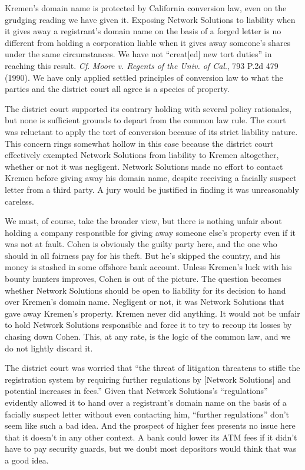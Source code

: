 Kremen's domain name is protected by California conversion law, even on the
grudging reading we have given it. Exposing Network Solutions to liability when
it gives away a registrant's domain name on the basis of a forged letter is no
different from holding a corporation liable when it gives away someone's shares
under the same circumstances. We have not ``creat[ed] new tort duties'' in
reaching this result. \textit{Cf}. \textit{Moore v. Regents of the Univ. of
Cal}., 793 P.2d 479 (1990). We have only applied settled principles of
conversion law to what the parties and the district court all agree is a
species of property.

The district court supported its contrary holding with several policy
rationales, but none is sufficient grounds to depart from the common law rule.
The court was reluctant to apply the tort of conversion because of its strict
liability nature. This concern rings somewhat hollow in this case because the
district court effectively exempted Network Solutions from liability to Kremen
altogether, whether or not it was negligent. Network Solutions made no effort
to contact Kremen before giving away his domain name, despite receiving a
facially suspect letter from a third party. A jury would be justified in
finding it was unreasonably careless.

We must, of course, take the broader view, but there is nothing unfair about
holding a company responsible for giving away someone else's property even if
it was not at fault. Cohen is obviously the guilty party here, and the one who
should in all fairness pay for his theft. But he's skipped the country, and his
money is stashed in some offshore bank account. Unless Kremen's luck with his
bounty hunters improves, Cohen is out of the picture. The question becomes
whether Network Solutions should be open to liability for its decision to hand
over Kremen's domain name. Negligent or not, it was Network Solutions that gave
away Kremen's property. Kremen never did anything. It would not be unfair to
hold Network Solutions responsible and force it to try to recoup its losses by
chasing down Cohen. This, at any rate, is the logic of the common law, and we
do not lightly discard it. 

The district court was worried that ``the threat of litigation threatens to
stifle the registration system by requiring further regulations by [Network
Solutions] and potential increases in fees.'' Given that Network Solutions's
``regulations'' evidently allowed it to hand over a registrant's domain name on
the basis of a facially suspect letter without even contacting him, ``further
regulations'' don't seem like such a bad idea. And the prospect of higher fees
presents no issue here that it doesn't in any other context. A bank could lower
its ATM fees if it didn't have to pay security guards, but we doubt most
depositors would think that was a good idea.

